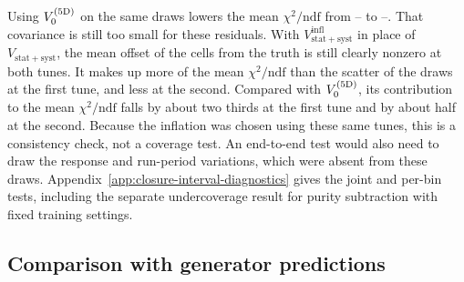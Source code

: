 Using $V_0^{(5\mathrm{D})}$ on the same draws lowers the mean $\chi^2/\mathrm{ndf}$ from -- to --. That covariance is still too small for these residuals. With $V_{\mathrm{stat+syst}}^{\mathrm{infl}}$ in place of $V_{\mathrm{stat+syst}}$, the mean offset of the cells from the truth is still clearly nonzero at both tunes. It makes up more of the mean $\chi^2/\mathrm{ndf}$ than the scatter of the draws at the first tune, and less at the second. Compared with $V_0^{(5\mathrm{D})}$, its contribution to the mean $\chi^2/\mathrm{ndf}$ falls by about two thirds at the first tune and by about half at the second. Because the inflation was chosen using these same tunes, this is a consistency check, not a coverage test. An end-to-end test would also need to draw the response and run-period variations, which were absent from these draws. Appendix~\ref{app:closure-interval-diagnostics} gives the joint and per-bin tests, including the separate undercoverage result for purity subtraction with fixed training settings.

\subsection{Comparison with generator predictions}
\label{sec:sixteen-cell-generator-comparison}
\label{sec:fived16-gen}

